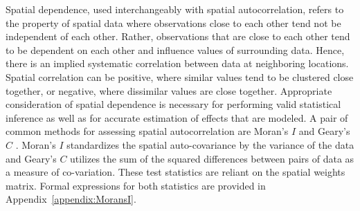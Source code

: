 \documentclass{article}[11pt]
\begin{document}
Spatial dependence, used interchangeably with spatial autocorrelation, refers to the property of spatial data where observations close to each other tend not be independent of each other. Rather, observations that are close to each other tend to be dependent on each other and influence values of surrounding data. Hence, there is an implied systematic correlation between data at neighboring locations. Spatial correlation can be positive, where similar values tend to be clustered close together, or negative, where dissimilar values are close together. Appropriate consideration of spatial dependence is necessary for performing valid statistical inference as well as for accurate estimation of effects that are modeled. A pair of common methods for assessing spatial autocorrelation are Moran's $\textit{I}$ \cite{moran_interpretation_1948}\cite{moran_notes_1950} and Geary's $\textit{C}$ \cite{geary_contiguity_1954}\cite{waller_applied_2004}. Moran's $\textit{I}$ standardizes the spatial auto-covariance by the variance of the data and Geary's $\textit{C}$ utilizes the sum of the squared differences between pairs of data as a measure of co-variation. These test statistics are reliant on the spatial weights matrix. Formal expressions for both statistics are provided in Appendix~\ref{appendix:MoransI}.


\end{document}
